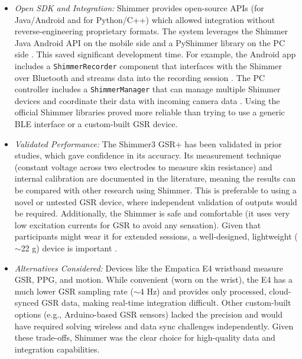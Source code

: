 \begin{itemize}
    \item \emph{Open SDK and Integration:} Shimmer provides open-source APIs (for Java/Android and for Python/C++) which allowed integration without reverse-engineering proprietary formats. The system leverages the Shimmer Java Android API on the mobile side and a PyShimmer library on the PC side \cite{ref15}. This saved significant development time. For example, the Android app includes a \texttt{ShimmerRecorder} component that interfaces with the Shimmer over Bluetooth and streams data into the recording session \cite{ref15}. The PC controller includes a \texttt{ShimmerManager} that can manage multiple Shimmer devices and coordinate their data with incoming camera data \cite{ref15}. Using the official Shimmer libraries proved more reliable than trying to use a generic BLE interface or a custom-built GSR device.
    \item \emph{Validated Performance:} The Shimmer3 GSR+ has been validated in prior studies, which gave confidence in its accuracy. Its measurement technique (constant voltage across two electrodes to measure skin resistance) and internal calibration are documented in the literature, meaning the results can be compared with other research using Shimmer. This is preferable to using a novel or untested GSR device, where independent validation of outputs would be required. Additionally, the Shimmer is safe and comfortable (it uses very low excitation currents for GSR to avoid any sensation). Given that participants might wear it for extended sessions, a well-designed, lightweight ($\sim$22 g) device is important \cite{ref8}.
    \item \emph{Alternatives Considered:} Devices like the Empatica E4 wristband measure GSR, PPG, and motion. While convenient (worn on the wrist), the E4 has a much lower GSR sampling rate ($\sim$4 Hz) and provides only processed, cloud-synced GSR data, making real-time integration difficult. Other custom-built options (e.g., Arduino-based GSR sensors) lacked the precision and would have required solving wireless and data sync challenges independently. Given these trade-offs, Shimmer was the clear choice for high-quality data and integration capabilities.
\end{itemize}

